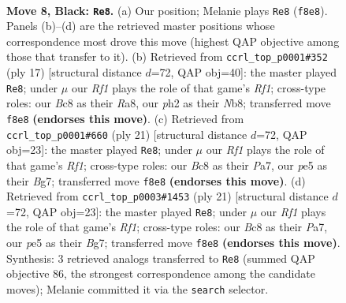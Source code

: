 \documentclass[11pt]{article}
\begin{document}
\begin{figure}[p]\centering
\begin{subfigure}{0.46\textwidth}\centering
\resizebox{\linewidth}{!}{%
\newchessgame
\chessboard[
  setfen={rnb2rk1/pppnqppp/4p3/3pP3/3P4/2N5/PPP1QPPP/2KR1BNR b - - 3 8},
  showmover=false,
  pgfstyle=straightmove, color=movearrow, markmove={f8-e8}
]}
\caption{}
\end{subfigure}\hfill
\begin{subfigure}{0.46\textwidth}\centering
\resizebox{\linewidth}{!}{%
\newchessgame
\chessboard[
  setfen={rnbq1rk1/pp3pbp/2pp1np1/8/2PNP3/2N3P1/PP3PBP/R1BQ1RK1 b - - 0 9},
  showmover=false,
  pgfstyle=straightmove, color=movearrow, markmove={f8-e8}
]}
\caption{}
\end{subfigure}
\\[4pt]
\begin{subfigure}{0.46\textwidth}\centering
\resizebox{\linewidth}{!}{%
\newchessgame
\chessboard[
  setfen={r2q1rk1/ppp2pbp/n2p1np1/8/2PNP3/2N1B3/PP2QPPP/R3R1K1 b - - 0 11},
  showmover=false,
  pgfstyle=straightmove, color=movearrow, markmove={f8-e8}
]}
\caption{}
\end{subfigure}\hfill
\begin{subfigure}{0.46\textwidth}\centering
\resizebox{\linewidth}{!}{%
\newchessgame
\chessboard[
  setfen={r2q1rk1/ppp2pbp/n2p1np1/8/2PNP3/2N1B3/PP2QPPP/R3R1K1 b - - 0 11},
  showmover=false,
  pgfstyle=straightmove, color=movearrow, markmove={f8-e8}
]}
\caption{}
\end{subfigure}
\caption{\textbf{Move 8, Black: \texttt{Re8}.} (a) Our position; Melanie plays \texttt{Re8} (\texttt{f8e8}). Panels (b)--(d) are the retrieved master positions whose correspondence most drove this move (highest QAP objective among those that transfer to it). (b) Retrieved from \texttt{ccrl\_top\_p0001\#352} (ply 17) [structural distance $d$=72, QAP obj=40]: the master played \texttt{Re8}; under $\mu$ our \emph{Rf1} plays the role of that game's \emph{Rf1}; cross-type roles: our \emph{B}c8 as their \emph{R}a8, our \emph{p}h2 as their \emph{N}b8; transferred move \texttt{f8e8} \textbf{(endorses this move)}. (c) Retrieved from \texttt{ccrl\_top\_p0001\#660} (ply 21) [structural distance $d$=72, QAP obj=23]: the master played \texttt{Re8}; under $\mu$ our \emph{Rf1} plays the role of that game's \emph{Rf1}; cross-type roles: our \emph{B}c8 as their \emph{P}a7, our \emph{p}e5 as their \emph{B}g7; transferred move \texttt{f8e8} \textbf{(endorses this move)}. (d) Retrieved from \texttt{ccrl\_top\_p0003\#1453} (ply 21) [structural distance $d$=72, QAP obj=23]: the master played \texttt{Re8}; under $\mu$ our \emph{Rf1} plays the role of that game's \emph{Rf1}; cross-type roles: our \emph{B}c8 as their \emph{P}a7, our \emph{p}e5 as their \emph{B}g7; transferred move \texttt{f8e8} \textbf{(endorses this move)}. Synthesis: 3 retrieved analogs transferred to \texttt{Re8} (summed QAP objective 86, the strongest correspondence among the candidate moves); Melanie committed it via the \texttt{search} selector.}
\label{fig:thought-m15}
\end{figure}
\end{document}
